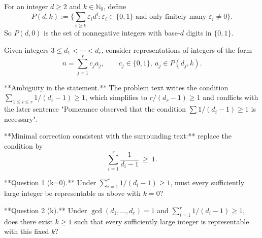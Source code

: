 For an integer $d\ge 2$ and $k\in\mathbb{N}_0$, define
\[
P(d,k) := \Big\{\sum_{i\ge k} \varepsilon_i d^i : \varepsilon_i\in\{0,1\}\text{ and only finitely many }\varepsilon_i\neq 0\Big\}.
\]
So $P(d,0)$ is the set of nonnegative integers with base-$d$ digits in $\{0,1\}$.

Given integers $3\le d_1<\cdots<d_r$, consider representations of integers of the form
\[
 n = \sum_{j=1}^r c_j a_j, \qquad c_j\in\{0,1\},\ a_j\in P(d_j,k).
\]

**Ambiguity in the statement.** The problem text writes the condition
$\sum_{1\le i\le r} 1/(d_r-1)\ge 1$, which simplifies to $r/(d_r-1)\ge 1$ and conflicts with the later sentence "Pomerance observed that the condition $\sum 1/(d_i-1)\ge 1$ is necessary".

**Minimal correction consistent with the surrounding text:** replace the condition by
\[
\sum_{i=1}^r \frac{1}{d_i-1}\ \ge\ 1.
\]

**Question 1 (k=0).** Under $\sum_{i=1}^r 1/(d_i-1)\ge 1$, must every sufficiently large integer be representable as above with $k=0$?

**Question 2 (k).** Under $\gcd(d_1,\dots,d_r)=1$ and $\sum_{i=1}^r 1/(d_i-1)\ge 1$, does there exist $k\ge 1$ such that every sufficiently large integer is representable with this fixed $k$?
